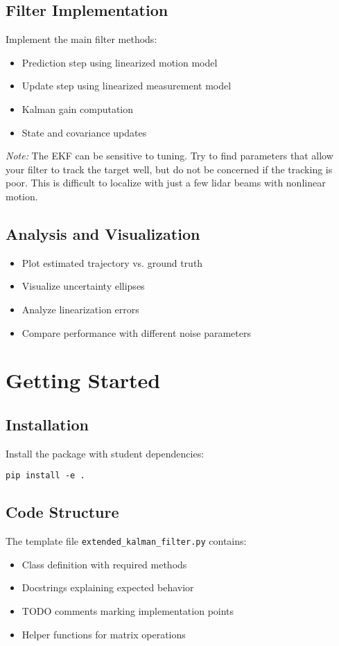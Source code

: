 \documentclass[11pt]{article}
\begin{document}
\subsection{Filter Implementation }
Implement the main filter methods:
\begin{itemize}
    \item Prediction step using linearized motion model
    \item Update step using linearized measurement model
    \item Kalman gain computation
    \item State and covariance updates
\end{itemize}
\emph{Note: } The EKF can be sensitive to tuning. Try to find parameters that allow your filter to track the target well, but do not be concerned if the tracking is poor. This is difficult to localize with just a few lidar beams with nonlinear motion.

\subsection{Analysis and Visualization }
\begin{itemize}
    \item Plot estimated trajectory vs. ground truth
    \item Visualize uncertainty ellipses
    \item Analyze linearization errors
    \item Compare performance with different noise parameters
\end{itemize}

\section{Getting Started}

\subsection{Installation}
Install the package with student dependencies:
\begin{verbatim}
pip install -e .
\end{verbatim}

\subsection{Code Structure}
The template file \texttt{extended\_kalman\_filter.py} contains:
\begin{itemize}
    \item Class definition with required methods
    \item Docstrings explaining expected behavior
    \item TODO comments marking implementation points
    \item Helper functions for matrix operations
\end{itemize}
\end{document}

